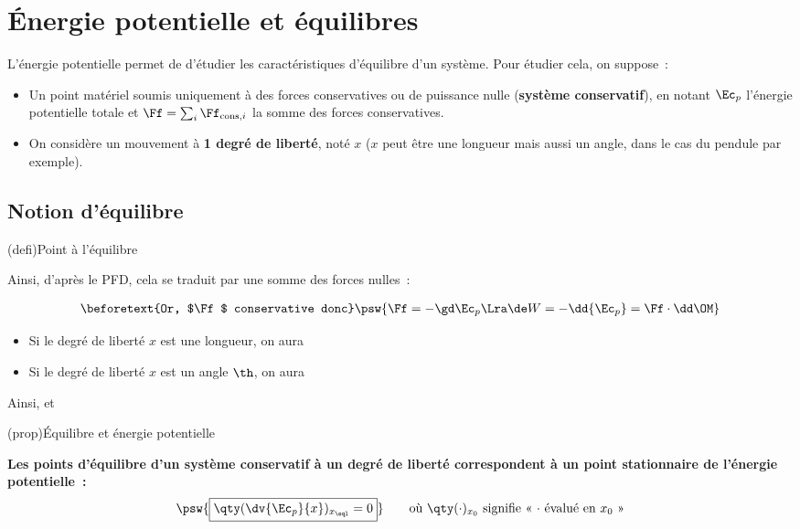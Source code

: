 \documentclass[../../main/main.tex]{subfiles}
\begin{document}
\section{Énergie potentielle et équilibres}
L'énergie potentielle permet de d'étudier les caractéristiques d'équilibre d'un
système. Pour étudier cela, on suppose~:
\begin{itemize}
	\item Un point matériel soumis uniquement à des forces conservatives ou de
	      puissance nulle (\textbf{système conservatif}), en notant $\Ec_p$
	      l'énergie potentielle totale et $\Ff = \sum_i \Ff_{{\rm cons},i}$ la
	      somme des forces conservatives.
	\item On considère un mouvement à \textbf{1 degré de liberté}, noté $x$ ($x$
	      peut être une longueur mais aussi un angle, dans le cas du pendule par
	      exemple).
\end{itemize}

\subsection{Notion d'équilibre}
\begin{tcb*}(defi){Point à l'équilibre}
	\begin{framed}
		\begin{center}
			\vspace{-15pt}
		\end{center}
	\end{framed}
	Ainsi, d'après le PFD, cela se traduit par une somme des forces nulles~:
	\psw{\[\boxed{\Ff(x=x_{\eql}) = \of}\]}
	\vspace{-15pt}
\end{tcb*}
\vspace{-15pt}
\begin{gather*}
	\beforetext{Or, $\Ff$ conservative donc}
	\psw{\Ff = -\gd\Ec_p \Lra \de W = -\dd{\Ec_p} = \Ff\cdot\dd\OM}
\end{gather*}
\vspace{-15pt}
\begin{itemize}
	\item Si le degré de liberté $x$ est une longueur, on aura
	\item Si le degré de liberté $x$ est un angle $\th$, on aura
\end{itemize}
Ainsi,  et
\begin{tcb*}(prop){Équilibre et énergie potentielle}
	\begin{center}
		\textbf{
			Les points d'équilibre d'un système conservatif à un degré de liberté
			correspondent à un point stationnaire de l'énergie potentielle~:}
		\[
			\psw{\boxed{\qty(\dv{\Ec_p}{x})_{x_{\eql}} = 0}}
			\qquad
			\text{où $\qty(\cdot)_{x_0}$ signifie «~$\cdot$ évalué en $x_0$~»}
		\]
	\end{center}
\end{tcb*}
\end{document}

